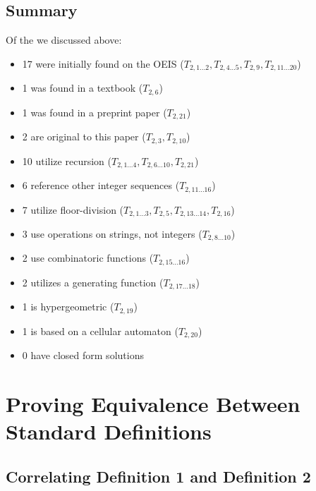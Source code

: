 \documentclass[conference]{IEEEtran}
\begin{document}
\subsection{Summary}

Of the \TotalOriginals we discussed above:
\begin{itemize}
    \item 17 were initially found on the OEIS \cite{OEIS-TMS, OEIS-TMS-inv, OEIS-TMS-pos-neg, OEIS-TMS-3-2, OEIS-TMS-inv-plus1} ($T_{2,1\dots2}, T_{2,4\dots5}, T_{2,9}, T_{2,11\dots20}$)
    \item 1 was found in a textbook \cite{Arndt_2010} ($T_{2,6}$)
    \item 1 was found in a preprint paper \cite{cooper_2011} ($T_{2,21}$)
    \item 2 are original to this paper ($T_{2,3}, T_{2,10}$)
    \\%
    \item 10 utilize recursion ($T_{2,1\dots4}, T_{2,6\dots10}, T_{2,21}$)
    \item 6 reference other integer sequences ($T_{2,11\dots16}$)
    \item 7 utilize floor-division ($T_{2,1\dots3}, T_{2,5}, T_{2,13\dots14}, T_{2,16}$)
    \item 3 use operations on strings, not integers ($T_{2,8\dots10}$)
    \item 2 use combinatoric functions ($T_{2,15\dots16}$)
    \item 2 utilizes a generating function ($T_{2,17\dots18}$)
    \item 1 is hypergeometric ($T_{2,19}$)
    \item 1 is based on a cellular automaton ($T_{2,20}$)
    \item 0 have closed form solutions
\end{itemize}

\section{Proving Equivalence Between Standard Definitions}

\subsection{Correlating Definition 1 and Definition 2}
\end{document}
